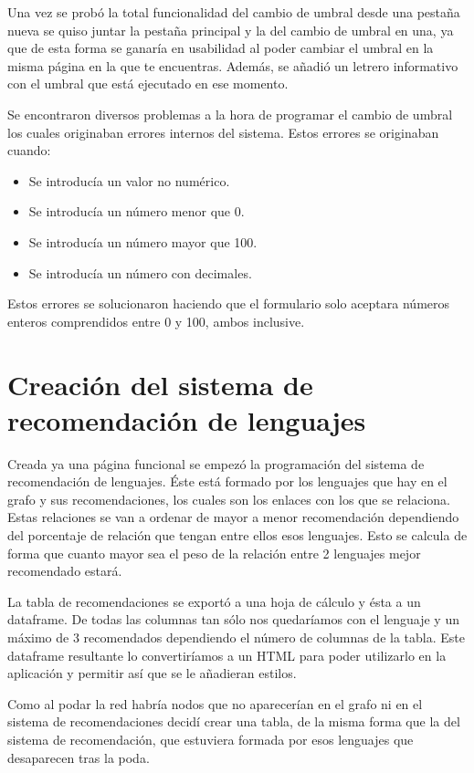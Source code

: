 Una vez se probó la total funcionalidad del cambio de umbral desde una pestaña nueva se quiso juntar la pestaña principal y la del cambio de umbral en una, ya que de esta forma se ganaría en usabilidad al poder cambiar el umbral en la misma página en la que te encuentras. Además, se añadió un letrero informativo con el umbral que está ejecutado en ese momento.

Se encontraron diversos problemas a la hora de programar el cambio de umbral los cuales originaban errores internos del sistema. Estos errores se originaban cuando: 
\begin{itemize}
    \item Se introducía un valor no numérico.
    \item Se introducía un número menor que 0.
    \item Se introducía un número mayor que 100.
    \item Se introducía un número con decimales.
\end{itemize}

Estos errores se solucionaron haciendo que el formulario solo aceptara números enteros comprendidos entre 0 y 100, ambos inclusive.

\section{Creación del sistema de recomendación de lenguajes}
Creada ya una página funcional se empezó la programación del sistema de recomendación de lenguajes. Éste está formado por los lenguajes que hay en el grafo y sus recomendaciones, los cuales son los enlaces con los que se relaciona. Estas relaciones se van a ordenar de mayor a menor recomendación dependiendo del porcentaje de relación que tengan entre ellos esos lenguajes. Esto se calcula de forma que cuanto mayor sea el peso de la relación entre 2 lenguajes mejor recomendado estará.

La tabla de recomendaciones se exportó a una hoja de cálculo y ésta a un dataframe. De todas las columnas tan sólo nos quedaríamos con el lenguaje y un máximo de 3 recomendados dependiendo el número de columnas de la tabla. Este dataframe resultante lo convertiríamos a un HTML para poder utilizarlo en la aplicación y permitir así que se le añadieran estilos.

Como al podar la red habría nodos que no aparecerían en el grafo ni en el sistema de recomendaciones decidí crear una tabla, de la misma forma que la del sistema de recomendación, que estuviera formada por esos lenguajes que desaparecen tras la poda.

